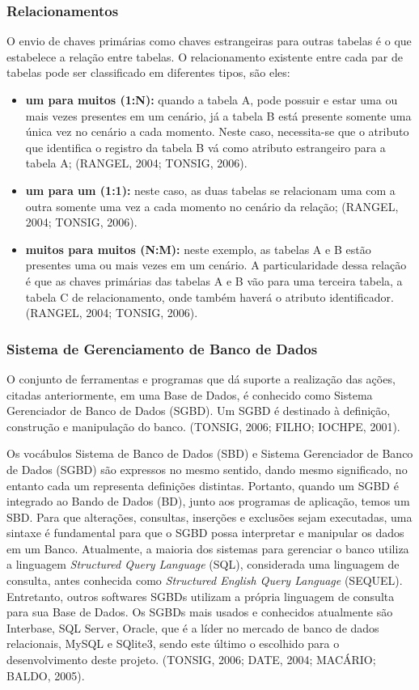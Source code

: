 \documentclass[a4paper,12pt]{article}
\begin{document}
\subsubsection{Relacionamentos}
O envio de chaves primárias como chaves estrangeiras para outras tabelas é o que estabelece a relação entre tabelas. O relacionamento 
existente entre cada par de tabelas pode ser classificado em diferentes tipos, são eles:
\begin{itemize}
	\item\textbf{um para muitos (1:N):} quando a tabela A, pode possuir e estar uma ou mais vezes presentes em um cenário, já a tabela B está presente somente uma 
	única vez no cenário a cada momento. Neste caso, necessita-se que o atributo que identifica o registro da tabela B vá como atributo estrangeiro para 
	a tabela A; (RANGEL, 2004; TONSIG, 2006).
	\item\textbf{um para um (1:1):} neste caso, as duas tabelas se relacionam uma com a outra somente uma vez a cada momento 
	no cenário da relação; (RANGEL, 2004; TONSIG, 2006).
	\item\textbf{muitos para muitos (N:M):} neste exemplo, as tabelas A e B estão presentes uma ou mais vezes em um cenário. 
	A particularidade dessa relação é que as chaves primárias das tabelas A e B vão para uma terceira tabela, a tabela C de relacionamento, 
	onde também haverá o atributo identificador. (RANGEL, 2004; TONSIG, 2006).
\end{itemize}

\subsubsection{Sistema de Gerenciamento de Banco de Dados}
O conjunto de ferramentas e programas que dá suporte a realização das ações, citadas anteriormente, em uma Base de Dados, é conhecido como 
Sistema Gerenciador de Banco de Dados (SGBD). Um SGBD é destinado à definição, construção e manipulação do banco. (TONSIG, 2006; FILHO; IOCHPE, 2001). 

Os vocábulos Sistema de Banco de Dados (SBD) e Sistema Gerenciador de Banco de Dados (SGBD) são expressos no mesmo sentido, dando mesmo 
significado, no entanto cada um representa definições distintas. Portanto, quando um SGBD é integrado ao Bando de Dados (BD), junto aos 
programas de aplicação, temos um SBD. Para que alterações, consultas, inserções e exclusões sejam executadas, uma sintaxe é fundamental 
para que o SGBD possa interpretar e manipular os dados em um Banco. Atualmente, a maioria dos sistemas para gerenciar o banco utiliza a 
linguagem \textit{Structured Query Language} (SQL), considerada uma linguagem de consulta, antes conhecida 
como \textit{Structured English Query Language} (SEQUEL). Entretanto, outros softwares SGBDs utilizam a própria linguagem de 
consulta para sua Base de Dados. Os SGBDs mais usados e 
conhecidos atualmente são Interbase, SQL Server, Oracle, que é a líder no mercado de banco de dados relacionais, 
MySQL e SQlite3, sendo este último o escolhido para o desenvolvimento deste projeto. (TONSIG, 2006; DATE, 2004; MACÁRIO; BALDO, 2005). 
\end{document}
